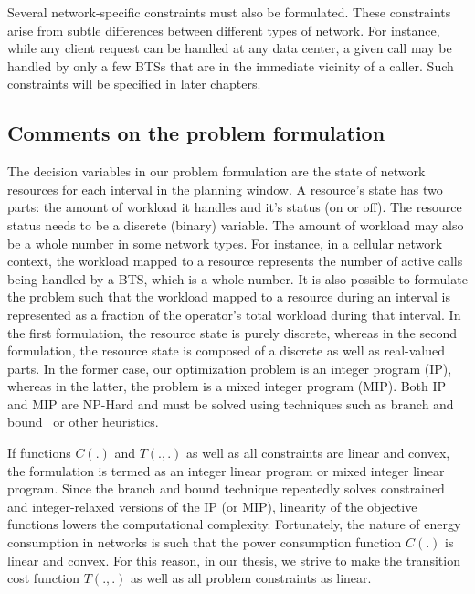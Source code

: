 Several network-specific constraints must also be formulated. These constraints arise from subtle differences between different types of network. For instance, while any client request can be handled at any data center, a given call may be handled by only a few BTSs that are in the immediate vicinity of a caller. Such constraints will be specified in later chapters.

\subsection{Comments on the problem formulation}
The decision variables in our problem formulation are the state of network resources for each interval in the planning window. A resource's state has two parts: the amount of workload it handles and it's status (on or off). The resource status needs to be a discrete (binary) variable. The amount of workload may also be a whole number in some network types. For instance, in a cellular network context, the workload mapped to a resource represents the number of active calls being handled by a BTS, which is a whole number. It is also possible to formulate the problem such that the workload mapped to a resource during an interval is represented as a fraction of the operator's total workload during that interval. In the first formulation, the resource state is purely discrete, whereas in the second formulation, the resource state is composed of a discrete as well as real-valued parts. In the former case, our optimization problem is an integer program (IP), whereas in the latter, the problem is a mixed integer program (MIP). Both IP and MIP are NP-Hard and must be solved using techniques such as branch and bound~\cite{land60a} or other heuristics. 

If functions $C(.)$ and $T(.,.)$ as well as all constraints are linear and convex, the formulation is termed as an integer linear program or mixed integer linear program. Since the branch and bound technique repeatedly solves constrained and integer-relaxed versions of the IP (or MIP), linearity of the objective functions lowers the computational complexity. Fortunately, the nature of energy consumption in networks is such that the power consumption function $C(.)$ is linear and convex. For this reason, in our thesis, we strive to make the transition cost function $T(.,.)$ as well as all problem constraints as linear.

